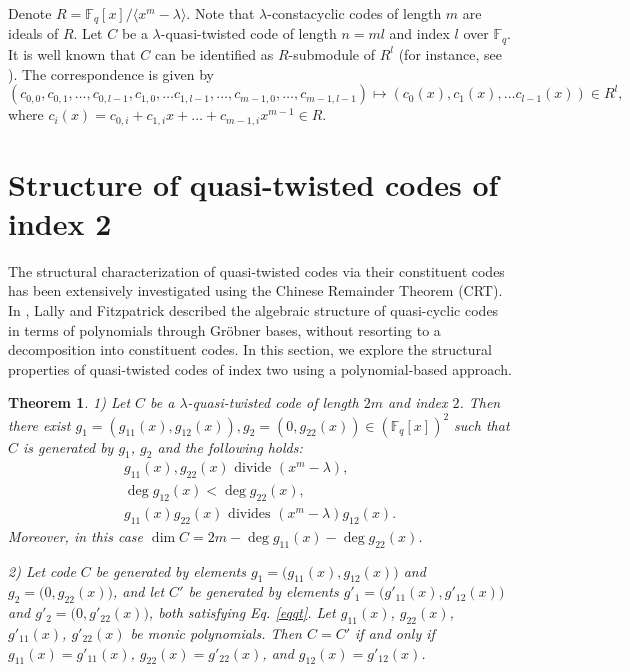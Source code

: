 \documentclass[12 pt]{extarticle}
\numberwithin{equation}{section}
\newtheorem{theorem}{Theorem}[section]
\theoremstyle{definition}
\begin{document}
 Denote $R=\mathbb{F}_q[x]/\langle x^m-\lambda\rangle$. Note that $\lambda$-constacyclic codes of length $m$ are ideals of $R$. Let $C$ be a $\lambda$-quasi-twisted code of length $n=ml$ and index $l$ over $\mathbb{F}_q$. It is well known that $C$ can be identified as $R$-submodule of $R^l$ (for instance, see \cite{jia2011}). The correspondence is given by
 $$(c_{0,0},c_{0,1},\dots,c_{0,l-1},c_{1,0},\dots c_{1,l-1},\dots,c_{m-1,0},\dots,c_{m-1,l-1})\mapsto (c_0(x),c_1(x),\dots c_{l-1}(x))\in R^l,$$
 where $c_i(x)=c_{0,i}+c_{1,i}x+\dots+c_{m-1,i}x^{m-1}\in R$. 




\section{Structure of quasi-twisted codes of index 2}
\label{structure}
The structural characterization of quasi-twisted codes via their constituent codes has been extensively investigated using the Chinese Remainder Theorem (CRT). In \cite{lally2001}, Lally and Fitzpatrick described the algebraic structure of quasi-cyclic codes in terms of polynomials through Gröbner bases, without resorting to a decomposition into constituent codes. In this section, we explore the structural properties of quasi-twisted codes of index two using a polynomial-based approach. 
\begin{theorem}\label{qtcode}
   1) Let $C$ be a $\lambda$-quasi-twisted code of length $2m$ and index $2$. Then there exist $g_1=(g_{11}(x),g_{12}(x)), g_2=(0,g_{22}(x))\in (\mathbb{F}_q[x])^2$ such that $C$ is generated by $g_1$, $g_2$ and the following holds:
    \begin{equation}\label{eqqt}
    \begin{split}
       g_{11}(x),g_{22}(x)\text{ divide } (x^m-\lambda), \\
       \deg g_{12}(x)< \deg g_{22}(x),\\
       g_{11}(x)g_{22}(x)\text{ divides } (x^m-\lambda)g_{12}(x).
    \end{split}        
    \end{equation} 
Moreover, in this case 
$\dim C = 2m- \deg g_{11}(x) - \deg g_{22}(x)$.      

2) Let code $C$ be generated by elements $g_1=\big( g_{11}(x),g_{12}(x)\big)$ and $g_2=\big( 0,g_{22}(x)\big)$, 
and let $C'$ be generated by elements $g'_1=\big( g'_{11}(x),g'_{12}(x)\big)$ and $g'_2=\big( 0,g'_{22}(x)\big)$, 
both satisfying Eq. \ref{eqqt}.  Let $g_{11}(x)$, $g_{22}(x)$, $g'_{11}(x)$, $g'_{22}(x)$ be monic polynomials. 
Then $C=C'$ if and only if $g_{11}(x) = g'_{11}(x)$, $g_{22}(x) = g'_{22}(x)$, and $g_{12}(x) = g'_{12}(x)$.  
\end{theorem}
\end{document}
